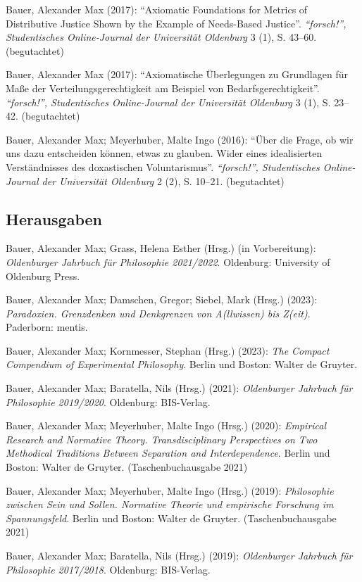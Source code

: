 \documentclass[a4paper,10pt]{article}
\newenvironment{literature}{%
   \parskip6pt\parindent0pt\raggedright
   \def\lititem{\hangindent=1cm\hangafter1}}{%
   \par\ignorespaces}
\begin{document}
\begin{literature}
\lititem Bauer, Alexander Max (2017): \enquote{Axiomatic Foundations for Metrics of Distributive Justice Shown by the Example of Needs-Based Justice}. \textit{\enquote{forsch!}, Studentisches Online-Journal der Universität Oldenburg} 3 (1), S. 43--60. (begutachtet)

\lititem Bauer, Alexander Max (2017): \enquote{Axiomatische Überlegungen zu Grundlagen für Maße der Verteilungsgerechtigkeit am Beispiel von Bedarfsgerechtigkeit}. \textit{\enquote{forsch!}, Studentisches Online-Journal der Universität Oldenburg} 3 (1), S. 23--42. (begutachtet)

\lititem Bauer, Alexander Max; Meyerhuber, Malte Ingo (2016): \enquote{Über die Frage, ob wir uns dazu entscheiden können, etwas zu glauben. Wider eines idealisierten Verständnisses des doxastischen Voluntarismus}. \textit{\enquote{forsch!}, Studentisches Online-Journal der Universität Oldenburg} 2 (2), S. 10--21. (begutachtet)
\end{literature}

\subsection*{Herausgaben}
\begin{literature}
\lititem Bauer, Alexander Max; Grass, Helena Esther (Hrsg.) (in Vorbereitung): \textit{Oldenburger Jahrbuch für Philosophie 2021/2022}. Oldenburg: University of Oldenburg Press.

\lititem Bauer, Alexander Max; Damschen, Gregor; Siebel, Mark (Hrsg.) (2023): \textit{Paradoxien. Grenzdenken und Denkgrenzen von A(llwissen) bis Z(eit)}. Paderborn: mentis.

\lititem Bauer, Alexander Max; Kornmesser, Stephan (Hrsg.) (2023): \textit{The Compact Compendium of Experimental Philosophy}. Berlin und Boston: Walter de Gruyter.

\lititem Bauer, Alexander Max; Baratella, Nils (Hrsg.) (2021): \textit{Oldenburger Jahrbuch für Philosophie 2019/2020}. Oldenburg: BIS-Verlag.

\lititem Bauer, Alexander Max; Meyerhuber, Malte Ingo (Hrsg.) (2020): \textit{Empirical Research and Normative Theory. Transdisciplinary Perspectives on Two Methodical Traditions Between Separation and Interdependence}. Berlin und Boston: Walter de Gruyter. (Taschenbuchausgabe 2021)

\lititem Bauer, Alexander Max; Meyerhuber, Malte Ingo (Hrsg.) (2019): \textit{Philosophie zwischen Sein und Sollen. Normative Theorie und empirische Forschung im Spannungsfeld}. Berlin und Boston: Walter de Gruyter. (Taschenbuchausgabe 2021)

\lititem Bauer, Alexander Max; Baratella, Nils (Hrsg.) (2019): \textit{Oldenburger Jahrbuch für Philosophie 2017/2018}. Oldenburg: BIS-Verlag.
\end{literature}
\end{document}
